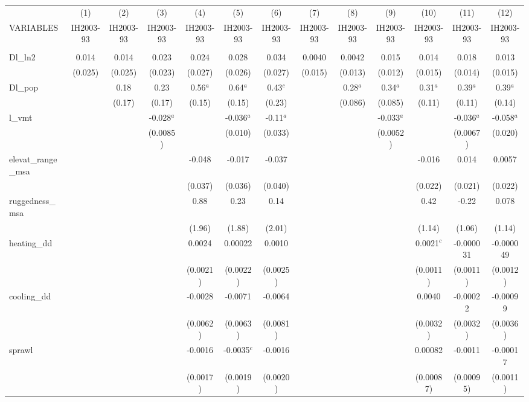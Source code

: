 \documentclass[]{article}
\begin{document}
\begin{tabular}{lcccccccccccc} \hline
 & (1) & (2) & (3) & (4) & (5) & (6) & (7) & (8) & (9) & (10) & (11) & (12) \\
VARIABLES & IH2003-93 & IH2003-93 & IH2003-93 & IH2003-93 & IH2003-93 & IH2003-93 & IH2003-93 & IH2003-93 & IH2003-93 & IH2003-93 & IH2003-93 & IH2003-93 \\ \hline
 &  &  &  &  &  &  &  &  &  &  &  &  \\
Dl\_ln2 & 0.014 & 0.014 & 0.023 & 0.024 & 0.028 & 0.034 & 0.0040 & 0.0042 & 0.015 & 0.014 & 0.018 & 0.013 \\
 & (0.025) & (0.025) & (0.023) & (0.027) & (0.026) & (0.027) & (0.015) & (0.013) & (0.012) & (0.015) & (0.014) & (0.015) \\
Dl\_pop &  & 0.18 & 0.23 & 0.56$^a$ & 0.64$^a$ & 0.43$^c$ &  & 0.28$^a$ & 0.34$^a$ & 0.31$^a$ & 0.39$^a$ & 0.39$^a$ \\
 &  & (0.17) & (0.17) & (0.15) & (0.15) & (0.23) &  & (0.086) & (0.085) & (0.11) & (0.11) & (0.14) \\
l\_vmt &  &  & -0.028$^a$ &  & -0.036$^a$ & -0.11$^a$ &  &  & -0.033$^a$ &  & -0.036$^a$ & -0.058$^a$ \\
 &  &  & (0.0085) &  & (0.010) & (0.033) &  &  & (0.0052) &  & (0.0067) & (0.020) \\
elevat\_range\_msa &  &  &  & -0.048 & -0.017 & -0.037 &  &  &  & -0.016 & 0.014 & 0.0057 \\
 &  &  &  & (0.037) & (0.036) & (0.040) &  &  &  & (0.022) & (0.021) & (0.022) \\
ruggedness\_msa &  &  &  & 0.88 & 0.23 & 0.14 &  &  &  & 0.42 & -0.22 & 0.078 \\
 &  &  &  & (1.96) & (1.88) & (2.01) &  &  &  & (1.14) & (1.06) & (1.14) \\
heating\_dd &  &  &  & 0.0024 & 0.00022 & 0.0010 &  &  &  & 0.0021$^c$ & -0.000031 & -0.000049 \\
 &  &  &  & (0.0021) & (0.0022) & (0.0025) &  &  &  & (0.0011) & (0.0011) & (0.0012) \\
cooling\_dd &  &  &  & -0.0028 & -0.0071 & -0.0064 &  &  &  & 0.0040 & -0.00022 & -0.00099 \\
 &  &  &  & (0.0062) & (0.0063) & (0.0081) &  &  &  & (0.0032) & (0.0032) & (0.0036) \\
sprawl &  &  &  & -0.0016 & -0.0035$^c$ & -0.0016 &  &  &  & 0.00082 & -0.0011 & -0.00017 \\
 &  &  &  & (0.0017) & (0.0019) & (0.0020) &  &  &  & (0.00087) & (0.00095) & (0.0011) \\

\end{tabular}
\end{document}
